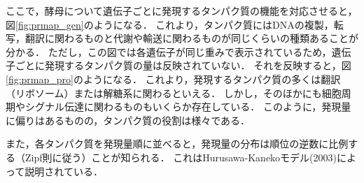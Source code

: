 ここで，酵母について遺伝子ごとに発現するタンパク質の機能を対応させると，図\ref{fig:prmap_gen}のようになる．
これより，タンパク質にはDNAの複製，転写，翻訳に関わるものと代謝や輸送に関わるものが同じくらいの種類あることが分かる．
ただし，この図では各遺伝子が同じ重みで表示されているため，遺伝子ごとに発現するタンパク質の量は反映されていない．
それを反映すると，図\ref{fig:prmap_pro}のようになる．
これより，発現するタンパク質の多くは翻訳（リボソーム）または解糖系に関わるといえる．
しかし，そのほかにも細胞周期やシグナル伝達に関わるものもいくらか存在している．
このように，発現量に偏りはあるものの，タンパク質の役割は様々である．

また，各タンパク質を発現量順に並べると，発現量の分布は順位の逆数に比例する（Zipf則に従う）ことが知られる．
これはHurusawa-Kanekoモデル(2003)によって説明されている．